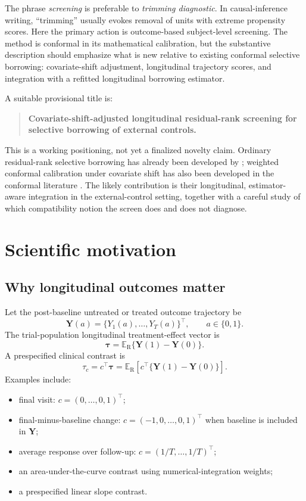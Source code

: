 \documentclass[11pt]{article}
\newcommand{\R}{\mathrm{R}}
\newcommand{\Exp}{\mathbb{E}}
\begin{document}
The phrase \emph{screening} is preferable to \emph{trimming diagnostic}. In causal-inference writing, ``trimming'' usually evokes removal of units with extreme propensity scores. Here the primary action is outcome-based subject-level screening. The method is conformal in its mathematical calibration, but the substantive description should emphasize what is new relative to existing conformal selective borrowing: covariate-shift adjustment, longitudinal trajectory scores, and integration with a refitted longitudinal borrowing estimator.

A suitable provisional title is:

\begin{quote}
\textbf{Covariate-shift-adjusted longitudinal residual-rank screening for selective borrowing of external controls.}
\end{quote}

This is a working positioning, not yet a finalized novelty claim. Ordinary residual-rank selective borrowing has already been developed by \citet{zhu2025csb}; weighted conformal calibration under covariate shift has also been developed in the conformal literature \citep{tibshirani2019weighted,jin2026weighted}. The likely contribution is their longitudinal, estimator-aware integration in the external-control setting, together with a careful study of which compatibility notion the screen does and does not diagnose.

\section{Scientific motivation}

\subsection{Why longitudinal outcomes matter}

Let the post-baseline untreated or treated outcome trajectory be
\[
\bm Y(a)=\{Y_1(a),\ldots,Y_T(a)\}^{\top}, \qquad a\in\{0,1\}.
\]
The trial-population longitudinal treatment-effect vector is
\[
\bm\tau=\Exp_{\R}\{\bm Y(1)-\bm Y(0)\}.
\]
A prespecified clinical contrast is
\[
\tau_c=c^{\top}\bm\tau
=\Exp_{\R}\!\left[c^{\top}\{\bm Y(1)-\bm Y(0)\}\right].
\]
Examples include:
\begin{itemize}
    \item final visit: $c=(0,\ldots,0,1)^{\top}$;
    \item final-minus-baseline change: $c=(-1,0,\ldots,0,1)^{\top}$ when baseline is included in $\bm Y$;
    \item average response over follow-up: $c=(1/T,\ldots,1/T)^{\top}$;
    \item an area-under-the-curve contrast using numerical-integration weights;
    \item a prespecified linear slope contrast.
\end{itemize}
\end{document}
